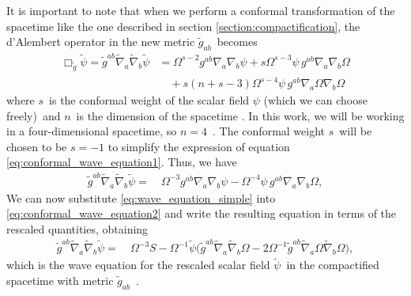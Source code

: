 It is important to note that when we perform a conformal transformation of the spacetime like the one described in section \ref{section:compactification}, the d'Alembert operator in the new metric $\tilde{g}_{ab}$~becomes
%
\begin{align}
    \Box_{\tilde{g}} \tilde{\psi} = \tilde{g}^{ab} \tilde{\nabla}_a \tilde{\nabla}_b \tilde{\psi}
    &= \Omega^{s-2} g^{ab} \nabla_a \nabla_b \psi + s \Omega^{s-3} \psi\, g^{ab} \nabla_a \nabla_b \Omega \\
    &\quad + s(n + s - 3) \Omega^{s-4} \psi\, g^{ab} \nabla_a \Omega \nabla_b \Omega
    \label{eq:conformal_wave_equation1}
\end{align}
%
where $s$~is the conformal weight of the scalar field $\psi$ (which we can choose freely)~and $n$~is the dimension of the spacetime \cite{wald:1984}. In this work, we will be working in a four-dimensional spacetime, so $n = 4$~. The conformal weight $s$~will be chosen to be $s = -1$ to simplify the expression of equation \eqref{eq:conformal_wave_equation1}. Thus, we have
%
\begin{align}
    \tilde{g}^{ab} \tilde{\nabla}_a \tilde{\nabla}_b \tilde{\psi} 
 =&~\Omega^{-3} g^{ab} \nabla_a \nabla_b \psi 
 - \Omega^{-4} \psi\, g^{ab} \nabla_a \nabla_b \Omega,
    \label{eq:conformal_wave_equation2}
\end{align}
%
We can now substitute \eqref{eq:wave_equation_simple} into \eqref{eq:conformal_wave_equation2} and write the resulting equation in terms of the rescaled quantities, obtaining
%
\begin{align}
    \tilde{g}^{ab} \tilde{\nabla}_a \tilde{\nabla}_b \tilde{\psi} 
 =&~\Omega^{-3} S 
 - \Omega^{-1} \tilde{\psi} \bigg( 
    \tilde{g}^{ab} \tilde{\nabla}_a \tilde{\nabla}_b \Omega 
 - 2 \Omega^{-1} \tilde{g}^{ab} \tilde{\nabla}_a \Omega \tilde{\nabla}_b \Omega \bigg),
\end{align}
%
which is the wave equation for the rescaled scalar field $\tilde{\psi}$~in the compactified spacetime with metric $\tilde{g}_{ab}$~.

